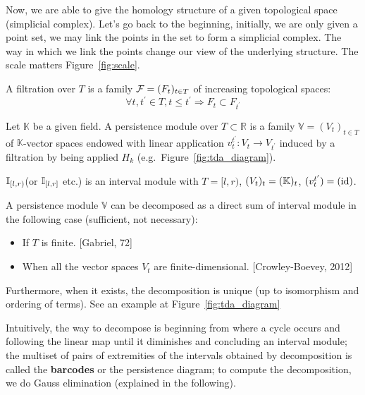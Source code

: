 Now, we are able to give the homology structure of a given topological space (simplicial complex).
Let's go back to the beginning, initially, we are only given a point set,
we may link the points in the set to form a simplicial complex.
The way in which we link the points change our view of the underlying structure.
The scale matters Figure~\ref{fig:scale}.


\begin{definition}[Filtration]
  A filtration over $T$ is a family $\mathcal{F} = (F_t)_{t\in T}$ of increasing topological spaces:
  $$
  \forall t, t^{\prime} \in T, t \leqslant t^{\prime} \Rightarrow F_t \subset F_{t^{\prime}}
  $$
\end{definition}

\begin{definition}
  Let $\mathbb{K}$ be a given field. A persistence module over $T \subset \mathbb{R}$ is a family $\mathbb{V}=\left(V_t\right)_{t \in T}$ of $\mathbb{K}$-vector spaces
  endowed with linear application $v_t^{t^{\prime}}: V_t \rightarrow V_{t^{\prime}}$ induced by
  a filtration by being applied $H_k$ (e.g.\ Figure~\ref{fig:tda_diagram}).

  $\mathbb{I}_{[l, r)}$(or $\mathbb{I}_{[l, r]}$ etc.) is an interval module with $T = [l, r)$,
  $(V_t)_t = (\mathbb{K})_t$, $(v^{t'}_t) = (\operatorname{id})$.
\end{definition}

\begin{theorem}
  A persistence module $\mathbb{V}$ can be decomposed as a direct sum of interval module
  in the following case (sufficient, not necessary):
  \begin{itemize}
    \item If $T$ is finite. [Gabriel, 72]
    \item When all the vector spaces $V_t$ are finite-dimensional. [Crowley-Boevey, 2012]
  \end{itemize}
  Furthermore, when it exists, the decomposition is unique (up to isomorphism and ordering of terms).
  See an example at Figure~\ref{fig:tda_diagram}
\end{theorem}

\RM Intuitively, the way to decompose is beginning from where a cycle occurs
and following the linear map until it diminishes and concluding an interval module;
the multiset of pairs of extremities of the intervals obtained by decomposition is called the \textbf{barcodes}
or the persistence diagram; to compute the decomposition, we do Gauss elimination (explained in the following).

